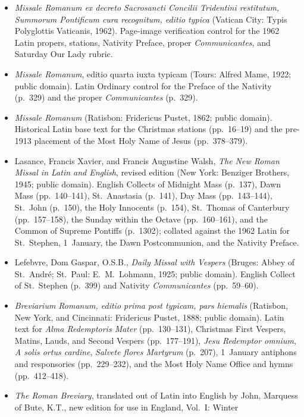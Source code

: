 \begin{itemize}
\item \textit{Missale Romanum ex decreto Sacrosancti Concilii Tridentini
restitutum, Summorum Pontificum cura recognitum, editio typica} (Vatican City:
Typis Polyglottis Vaticanis, 1962). Page-image verification control for the
1962 Latin propers, stations, Nativity Preface, proper \textit{Communicantes},
and Saturday Our Lady rubric.
\item \textit{Missale Romanum}, editio quarta iuxta typicam (Tours: Alfred Mame,
1922; public domain). Latin Ordinary control for the Preface of the Nativity
(p.~329) and the proper \textit{Communicantes} (p.~329).
\item \textit{Missale Romanum} (Ratisbon: Fridericus Pustet, 1862; public
domain). Historical Latin base text for the Christmas stations (pp.~16--19) and
the pre-1913 placement of the Most Holy Name of Jesus (pp.~378--379).
\item Lasance, Francis Xavier, and Francis Augustine Walsh, \textit{The New
Roman Missal in Latin and English}, revised edition (New York: Benziger
Brothers, 1945; public domain). English Collects of Midnight Mass (p.~137), Dawn
Mass (pp.~140--141), St.~Anastasia (p.~141), Day Mass (pp.~143--144), St.~John
(p.~150), the Holy Innocents (p.~154), St.~Thomas of Canterbury (pp.~157--158),
the Sunday within the Octave (pp.~160--161), and the Common of Supreme Pontiffs
(p.~1302); collated against the 1962 Latin for St.~Stephen, 1~January, the Dawn
Postcommunion, and the Nativity Preface.
\item Lefebvre, Dom Gaspar, O.S.B., \textit{Daily Missal with Vespers} (Bruges:
Abbey of St.~Andr\'e; St.~Paul: E.~M.~Lohmann, 1925; public domain). English
Collect of St.~Stephen (p.~399) and Nativity \textit{Communicantes} (pp.~59--60).
\item \textit{Breviarium Romanum, editio prima post typicam, pars hiemalis}
(Ratisbon, New York, and Cincinnati: Fridericus Pustet, 1888; public domain).
Latin text for \textit{Alma Redemptoris Mater} (pp.~130--131), Christmas First
Vespers, Matins, Lauds, and Second Vespers (pp.~177--191), \textit{Jesu
Redemptor omnium}, \textit{A solis ortus cardine}, \textit{Salvete flores
Martyrum} (p.~207), 1~January antiphons and responsories (pp.~229--232), and the
Most Holy Name Office and hymns (pp.~412--418).
\item \textit{The Roman Breviary}, translated out of Latin into English by John,
Marquess of Bute, K.T., new edition for use in England, Vol.~I: Winter

\end{itemize}
